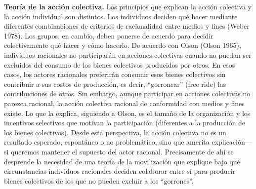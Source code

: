 \documentclass[letterpaper, 11pt]{book}
\theoremstyle{definition}
\theoremstyle{remark}
\begin{document}
{{{{{{{{{{\textbf{Teoría de la acción colectiva.} \small{Los principios que explican la acción colectiva y la acción individual son distintos. 
Los individuos deciden qué hacer mediante diferentes combinaciones de criterios de racionalidad entre medios y fines (Weber 1978). Los grupos, en cambio, deben ponerse de acuerdo para decidir colectivamente qué hacer y cómo hacerlo. 
De acuerdo con Olson (Olson 1965), individuos racionales no participarán en acciones colectivas cuando no puedan ser excluidos del consumo de los bienes colectivos producidos por otros. 
En esos casos, los actores racionales preferirán consumir esos bienes colectivos sin contribuir a sus costos de producción, es decir, ``gorronear'' (free ride) las contribuciones de otros. 
Sin embargo, aunque participar en acciones colectivas no parezca racional, la acción colectiva racional de conformidad con medios y fines existe. 
Lo que la explica, siguiendo a Olson, es el tamaño de la organización y los incentivos selectivos que motivan la participación (diferentes a la producción de los bienes colectivos). 
Desde esta perspectiva, la acción colectiva no es un resultado esperado, espontáneo o no problemático, sino que amerita explicación—si queremos mantener el supuesto del actor racional.
Precisamente de ahí se desprende la necesidad de una teoría de la movilización que explique bajo qué circunstancias individuos racionales deciden colaborar entre sí para producir bienes colectivos de los que no pueden excluir a los ``gorrones''.}\vspace{1em}








}}}}}}}}}}
\end{document}
